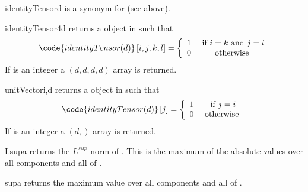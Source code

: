 \begin{funcdesc}{identityTensor}{d}
is a synonym for  (see above).
\end{funcdesc}
\begin{funcdesc}{identityTensor4}{d}
returns a \RankFour \Data object in \FunctionSpace {} such that
\begin{equation}
\code{identityTensor(d)}\left[ i,j,k,l\right] = \left\{ 
\begin{array}{cc}
1 & \mbox{ if } i=k \mbox{ and } j=l\\
0 & \mbox{ otherwise }
\end{array}
\right.
\end{equation}
If  is an integer a $(d,d,d,d)$ \numpy array is returned.
\end{funcdesc}
\begin{funcdesc}{unitVector}{i,d}
returns a \RankOne \Data object in \FunctionSpace {} such that
\begin{equation}
\code{identityTensor(d)}\left[ j \right] = \left\{ 
\begin{array}{cc}
1 & \mbox{ if } j=i\\
0 & \mbox{ otherwise }
\end{array}
\right.
\end{equation}
If  is an integer a $(d,)$ \numpy array is returned.

\end{funcdesc}

\begin{funcdesc}{Lsup}{a}
returns the $L^{sup}$ norm of . This is the maximum of the absolute values
 over all components and all \DataSamplePoints of . 
\end{funcdesc}

\begin{funcdesc}{sup}{a}
returns the maximum value over all components and all \DataSamplePoints of .
\end{funcdesc}

